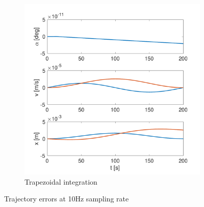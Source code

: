\documentclass{article}
\begin{document}
\begin{figure}[H]
\begin{subfigure}[t]{0.49\textwidth}
        \includegraphics[width=\textwidth]{trapezoidal_int_10hz}
        \caption{Trapezoidal integration}
    \end{subfigure}
    \caption{Trajectory errors at 10Hz sampling rate}
    \label{fig:error_10hz}
\end{figure}
\end{document}
